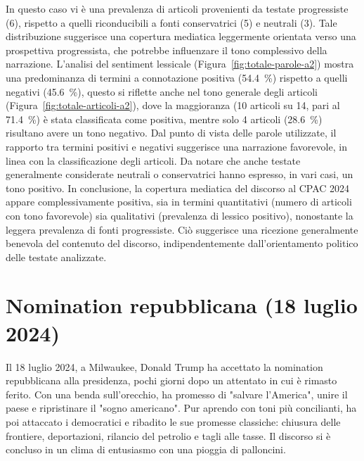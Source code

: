 In questo caso vi è una prevalenza di articoli provenienti da testate progressiste (6), rispetto a quelli riconducibili a fonti conservatrici (5) e neutrali (3). Tale distribuzione suggerisce una copertura mediatica leggermente orientata verso una prospettiva progressista, che potrebbe influenzare il tono complessivo della narrazione.
L'analisi del sentiment lessicale (Figura~\ref{fig:totale-parole-a2}) mostra una predominanza di termini a connotazione positiva (\SI{54.4}{\percent}) rispetto a quelli negativi (\SI{45.6}{\percent}), questo si riflette anche nel tono generale degli articoli (Figura~\ref{fig:totale-articoli-a2}), dove la maggioranza (10 articoli su 14, pari al \SI{71.4}{\percent}) è stata classificata come positiva, mentre solo 4 articoli (\SI{28.6}{\percent}) risultano avere un tono negativo.
Dal punto di vista delle parole utilizzate, il rapporto tra termini positivi e negativi suggerisce una narrazione favorevole, in linea con la classificazione degli articoli. Da notare che anche testate generalmente considerate neutrali o conservatrici hanno espresso, in vari casi, un tono positivo.
In conclusione, la copertura mediatica del discorso al CPAC 2024 appare complessivamente positiva, sia in termini quantitativi (numero di articoli con tono favorevole) sia qualitativi (prevalenza di lessico positivo), nonostante la leggera prevalenza di fonti progressiste. Ciò suggerisce una ricezione generalmente benevola del contenuto del discorso, indipendentemente dall’orientamento politico delle testate analizzate.

\newpage
\section{Nomination repubblicana (18 luglio 2024)}
Il 18 luglio 2024, a Milwaukee, Donald Trump ha accettato la nomination repubblicana alla presidenza, pochi giorni dopo un attentato in cui è rimasto ferito. Con una benda sull'orecchio, ha promesso di "salvare l'America", unire il paese e ripristinare il "sogno americano". 
Pur aprendo con toni più concilianti, ha poi attaccato i democratici e ribadito le sue promesse classiche: chiusura delle frontiere, deportazioni, rilancio del petrolio e tagli alle tasse.
Il discorso si è concluso in un clima di entusiasmo con una pioggia di palloncini. \\

